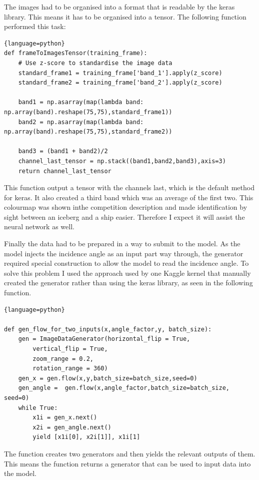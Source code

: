 \documentclass{article}
\begin{document}
The images had to be organised into a format that is readable by the keras library. This means it has to be organised into a tensor. The following function performed this task:
\begin{lstlisting}{language=python}
def frameToImagesTensor(training_frame):
    # Use z-score to standardise the image data
    standard_frame1 = training_frame['band_1'].apply(z_score)
    standard_frame2 = training_frame['band_2'].apply(z_score)

    band1 = np.asarray(map(lambda band: np.array(band).reshape(75,75),standard_frame1))
    band2 = np.asarray(map(lambda band: np.array(band).reshape(75,75),standard_frame2))
    
    band3 = (band1 + band2)/2
    channel_last_tensor = np.stack((band1,band2,band3),axis=3)
    return channel_last_tensor
\end{lstlisting}
This function output a tensor with the channels last, which is the default method for keras. It also created a third band which was an average of the first two. This colourmap was shown inthe competition description and made identification by sight between an iceberg and a ship easier. Therefore I expect it will assist the neural network as well. 

Finally the data had to be prepared in a way to submit to the model. As the model injects the incidence angle as an input part way through, the generator required special construction to allow the model to read the incidence angle. To solve this problem I used the approach used by one Kaggle kernel that manually created the generator rather than using the keras library, as seen in the following function. 
\begin{lstlisting}{language=python}

def gen_flow_for_two_inputs(x,angle_factor,y, batch_size):
    gen = ImageDataGenerator(horizontal_flip = True,
    	vertical_flip = True,
    	zoom_range = 0.2,
    	rotation_range = 360)
    gen_x = gen.flow(x,y,batch_size=batch_size,seed=0)
    gen_angle =  gen.flow(x,angle_factor,batch_size=batch_size, seed=0)
    while True:
        x1i = gen_x.next()
        x2i = gen_angle.next()
        yield [x1i[0], x2i[1]], x1i[1]
\end{lstlisting}
The function creates two generators and then yields the relevant outputs of them. This means the function returns a generator that can be used to input data into the model. 
\end{document}
